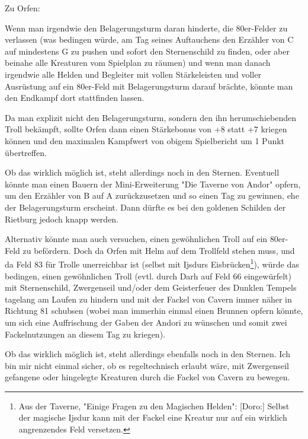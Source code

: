 \documentclass[10pt, a4paper, oneside]{book}
\begin{document}
{Zu Orfen:



Wenn man irgendwie den Belagerungsturm daran hinderte, die 80er-Felder zu verlassen (was bedingen würde, am Tag seines Auftauchens den Erzähler von C auf mindestens G zu pushen und sofort den Sternenschild zu finden, oder aber beinahe alle Kreaturen vom Spielplan zu räumen) und wenn man danach irgendwie alle Helden und Begleiter mit vollen Stärkeleisten und voller Ausrüstung auf ein 80er-Feld mit Belagerungsturm darauf brächte, könnte man den Endkampf dort stattfinden lassen.

Da man explizit nicht den Belagerungsturm, sondern den ihn herumschiebenden Troll bekämpft, sollte Orfen dann einen Stärkebonus von +8 statt +7 kriegen können und den maximalen Kampfwert von obigem Spielbericht um 1 Punkt übertreffen.

Ob das wirklich möglich ist, steht allerdings noch in den Sternen. Eventuell könnte man einen Bauern der Mini-Erweiterung "Die Taverne von Andor" opfern, um den Erzähler von B auf A zurückzusetzen und so einen Tag zu gewinnen, ehe der Belagerungsturm erscheint. Dann dürfte es bei den goldenen Schilden der Rietburg jedoch knapp werden.



Alternativ könnte man auch versuchen, einen gewöhnlichen Troll auf ein 80er-Feld zu befördern. Doch da Orfen mit Helm auf dem Trollfeld stehen muss, und da Feld 83 für Trolle unerreichbar ist (selbst mit Ijsdurs Eisbrücken\footnote{Aus der Taverne, "Einige Fragen zu den Magischen Helden": [Doro:] Selbst der magische Ijsdur kann mit der Fackel eine Kreatur nur auf ein wirklich angrenzendes Feld versetzen. }), würde das bedingen, einen gewöhnlichen Troll (evtl. durch Darh auf Feld 66 eingewürfelt) mit Sternenschild, Zwergenseil und/oder dem Geisterfeuer des Dunklen Tempels tagelang am Laufen zu hindern und mit der Fackel von Cavern immer näher in Richtung 81 schubsen (wobei man immerhin einmal einen Brunnen opfern könnte, um sich eine Auffrischung der Gaben der Andori zu wünschen und somit zwei Fackelnutzungen an diesem Tag zu kriegen).

Ob das wirklich möglich ist, steht allerdings ebenfalls noch in den Sternen. Ich bin mir nicht einmal sicher, ob es regeltechnisch erlaubt wäre, mit Zwergenseil gefangene oder hingelegte Kreaturen durch die Fackel von Cavern zu bewegen.\bigskip







}
\end{document}
